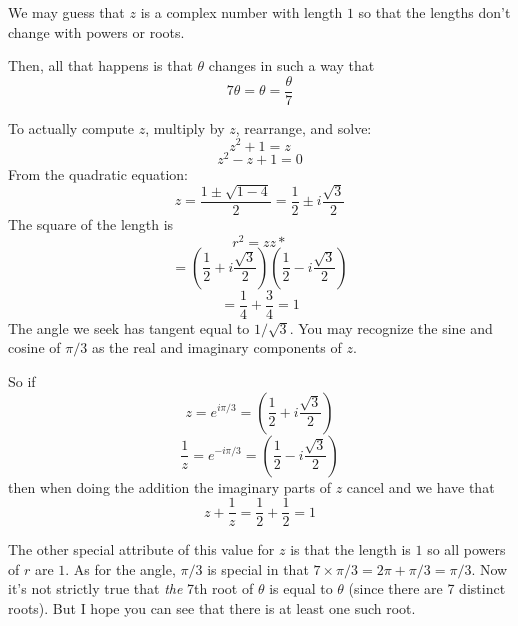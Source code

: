 \documentclass[11pt, oneside]{article}   	%
\begin{document}
We may guess that $z$ is a complex number with length $1$ so that the lengths don't change with powers or roots.  

Then, all that happens is that $\theta$ changes in such a way that 
\[ 7 \theta = \theta = \frac{\theta}{7}  \]

To actually compute $z$, multiply by $z$, rearrange, and solve:
\[ z^2 + 1 = z \]
\[ z^2 - z + 1 = 0 \]
From the quadratic equation:
\[ z = \frac{1 \pm \sqrt{1 - 4}}{2} = \frac{1}{2} \pm i \frac{\sqrt{3}}{2}  \]
The square of the length is
\[ r^2 = zz* \]
\[ = (\frac{1}{2} + i \frac{\sqrt{3}}{2}) (\frac{1}{2} - i \frac{\sqrt{3}}{2})  \]
\[ = \frac{1}{4} + \frac{3}{4} = 1 \]
The angle we seek has tangent equal to $1/\sqrt{3}$.  You may recognize the sine and cosine of $\pi/3$ as the real and imaginary components of $z$.

So if 
\[ z = e^{i \pi/3} = (\frac{1}{2} + i \frac{\sqrt{3}}{2}) \]
\[ \frac{1}{z} = e^{-i \pi/3} = (\frac{1}{2} - i \frac{\sqrt{3}}{2}) \]
then when doing the addition the imaginary parts of $z$ cancel and we have that 
\[ z + \frac{1}{z} = \frac{1}{2} + \frac{1}{2} = 1 \]

The other special attribute of this value for $z$ is that the length is $1$ so all powers of $r$ are $1$.  As for the angle, $\pi/3$ is special in that $7 \times \pi/3 = 2 \pi + \pi/3 = \pi/3$.  Now it's not strictly true that \emph{the} 7th root of $\theta$ is equal to $\theta$ (since there are 7 distinct roots).  But I hope you can see that there is at least one such root.
\end{document}
